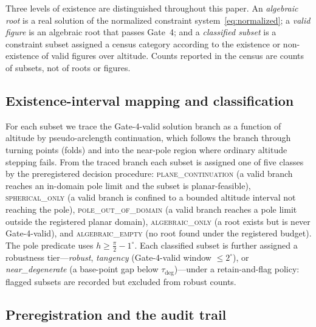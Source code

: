 \documentclass[pdflatex,sn-mathphys-num]{sn-jnl}
\theoremstyle{thmstyleone}%
\theoremstyle{thmstyletwo}%
\theoremstyle{thmstylethree}%
\begin{document}
Three levels of existence are distinguished throughout this paper. An
\emph{algebraic root} is a real solution of the normalized constraint
system~\eqref{eq:normalized}; a \emph{valid figure} is an algebraic root that
passes Gate~4; and a \emph{classified subset} is a constraint subset assigned a census category according to the existence or non-existence of valid figures over altitude. Counts reported in the census are counts of subsets, not of roots or figures.

\subsection{Existence-interval mapping and classification}
\label{sec:mapper}

For each subset we trace the Gate-4-valid solution branch as a function of
altitude by pseudo-arclength continuation, which follows the branch through
turning points (folds) and into the near-pole region where ordinary altitude
stepping fails. From the traced branch each subset is assigned one of five
classes by the preregistered decision procedure: \textsc{plane\_continuation}
(a valid branch reaches an in-domain pole limit and the subset is
planar-feasible), \textsc{spherical\_only} (a valid branch is confined to a
bounded altitude interval not reaching the pole), \textsc{pole\_out\_of\_domain} (a valid branch reaches a pole limit outside the registered planar domain), \textsc{algebraic\_only} (a root exists but is never Gate-4-valid), and \textsc{algebraic\_empty} (no root found under the registered budget). The pole predicate uses $h\ge \tfrac{\pi}{2}-1^\circ$. Each classified subset is further assigned a robustness tier---\emph{robust}, \emph{tangency} (Gate-4-valid window $\le 2^\circ$), or \emph{near\_degenerate} (a base-point gap below $\tau_{\deg}$)---under a retain-and-flag policy: flagged subsets are recorded but excluded from robust counts.

\subsection{Preregistration and the audit trail}
\label{sec:gates}
\end{document}
